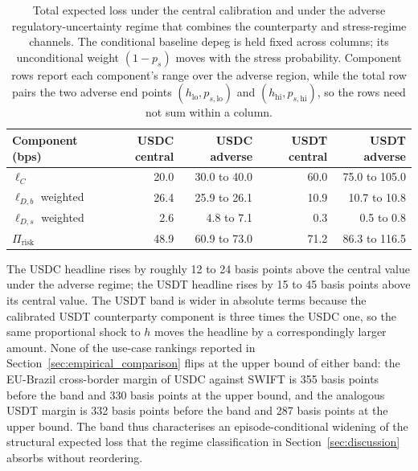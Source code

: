 \begin{table}[H]
\centering
\caption{Total expected loss under the central calibration and under the adverse regulatory-uncertainty regime that combines the counterparty and stress-regime channels. The conditional baseline depeg is held fixed across columns; its unconditional weight $(1-p_s)$ moves with the stress probability. Component rows report each component's range over the adverse region, while the total row pairs the two adverse end points $(h_{\text{lo}}, p_{s,\text{lo}})$ and $(h_{\text{hi}}, p_{s,\text{hi}})$, so the rows need not sum within a column.}\label{tab:reg_uncertainty_band}
\begin{tabular}{lrrrr}
\toprule
Component (bps)             & USDC central & USDC adverse & USDT central & USDT adverse \\
\midrule
$\ell_C$                    & 20.0  & 30.0 to 40.0  & 60.0  & 75.0 to 105.0 \\
$\ell_{D,b}$ weighted       & 26.4  & 25.9 to 26.1  & 10.9  & 10.7 to 10.8 \\
$\ell_{D,s}$ weighted       & 2.6   & 4.8 to 7.1    & 0.3   & 0.5 to 0.8 \\
\midrule
$\Pi_{\text{risk}}$         & 48.9  & 60.9 to 73.0  & 71.2  & 86.3 to 116.5 \\
\bottomrule
\end{tabular}
\end{table}

The USDC headline rises by roughly 12 to 24 basis points above the central value under the adverse regime; the USDT headline rises by 15 to 45 basis points above its central value. The USDT band is wider in absolute terms because the calibrated USDT counterparty component is three times the USDC one, so the same proportional shock to $h$ moves the headline by a correspondingly larger amount. None of the use-case rankings reported in Section~\ref{sec:empirical_comparison} flips at the upper bound of either band: the EU-Brazil cross-border margin of USDC against SWIFT is 355 basis points before the band and 330 basis points at the upper bound, and the analogous USDT margin is 332 basis points before the band and 287 basis points at the upper bound. The band thus characterises an episode-conditional widening of the structural expected loss that the regime classification in Section~\ref{sec:discussion} absorbs without reordering.
